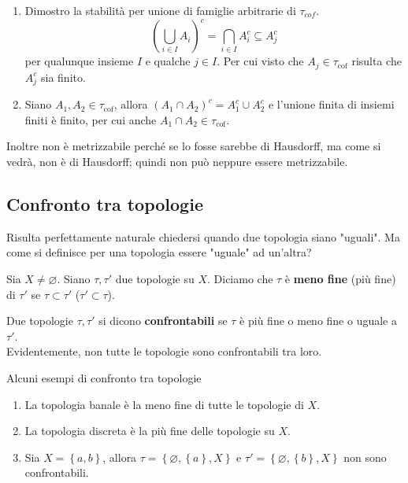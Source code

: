 \begin{example}
\begin{enumerate}
\begin{enumerate}
		\item Dimostro la stabilità per unione di famiglie arbitrarie di $\tau_{cof}$.
			\begin{equation*}
					\left(\bigcup_{i \in I} A_i\right)^c = \bigcap_{i \in I} A^c_i \subseteq A^c_j
			\end{equation*}
		per qualunque insieme $I$ e qualche $j \in I$. Per cui visto che $A_j \in \tau_{\text{cof}}$ risulta che $A^c_j$ sia finito.
		\item Siano $A_1, A_2 \in \tau_{\text{cof}}$, allora $(A_1 \cap A_2)^c = A^c_1 \cup A^c_2$ e l'unione finita di insiemi finiti è finito, per cui anche $A_1 \cap A_2 \in \tau_{\text{cof}}$. 
	\end{enumerate}	
	Inoltre non è metrizzabile perché se lo fosse sarebbe di Hausdorff, ma come si vedrà, non è di Hausdorff; quindi non può neppure essere metrizzabile.
\end{enumerate}
\end{example}



\subsection{\textcolor{TopGener}{\textbf{Confronto tra topologie}}}

Risulta perfettamente naturale chiedersi quando due topologia siano "uguali". Ma come si definisce per una topologia essere "uguale" ad un'altra?



\begin{definition}
	Sia $X \neq \varnothing$. Siano $\tau, \tau'$ due topologie su $X$. Diciamo che $\tau$ è \textbf{meno fine} (più fine) di $\tau'$ se $\tau \subset \tau'$ ($\tau' \subset \tau$).
\end{definition}

\begin{definition}
	Due topologie $\tau, \tau'$ si dicono \textbf{confrontabili} se $\tau$ è più fine o meno fine o uguale a $\tau'$. \\ Evidentemente, non tutte le topologie sono confrontabili tra loro.
\end{definition}

\begin{example}
	Alcuni esempi di confronto tra topologie
	\begin{enumerate}
		\item La topologia banale è la meno fine di tutte le topologie di $X$.
		\item La topologia discreta è la più fine delle topologie su $X$.
		\item Sia $X = \left\{a,b\right\}$, allora $\tau = \left\{\varnothing,\left\{a\right\}, X\right\}$ e $\tau' = \left\{\varnothing, \left\{b\right\}, X\right\}$ non sono confrontabili.
	\end{enumerate}
\end{example}



